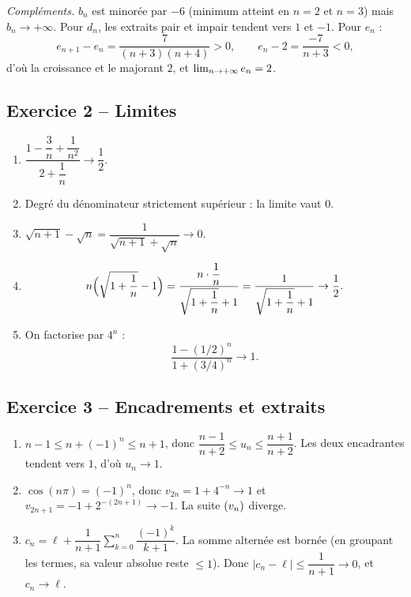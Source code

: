 \documentclass[11pt,a4paper]{article}
\begin{document}
\textit{Compléments.} $b_n$ est minorée par $-6$ (minimum atteint en $n=2$ et $n=3$) mais $b_n\to+\infty$. Pour $d_n$, les extraits pair et impair tendent vers $1$ et $-1$. Pour $e_n$ :
\[
e_{n+1}-e_n = \dfrac{7}{(n+3)(n+4)}>0, \qquad e_n-2=\dfrac{-7}{n+3}<0,
\]
d'où la croissance et le majorant $2$, et $\lim_{n\to +\infty} e_n=2$.

\subsection{Exercice 2 -- Limites}

\begin{enumerate}
  \item $\dfrac{1-\dfrac{3}{n}+\dfrac{1}{n^2}}{2+\dfrac{1}{n}}\to \dfrac{1}{2}$.
  \item Degré du dénominateur strictement supérieur : la limite vaut $0$.
  \item $\sqrt{n+1}-\sqrt{n} = \dfrac{1}{\sqrt{n+1}+\sqrt{n}}\to 0$.
  \item
  \[
  n\Bigl(\sqrt{1+\dfrac{1}{n}}-1\Bigr)
  = \dfrac{n\cdot\dfrac{1}{n}}{\sqrt{1+\dfrac{1}{n}}+1}
  = \dfrac{1}{\sqrt{1+\dfrac{1}{n}}+1}\to \dfrac12.
  \]
  \item On factorise par $4^n$ :
  \[
  \dfrac{1-(1/2)^n}{1+(3/4)^n}\to 1.
  \]
\end{enumerate}

\subsection{Exercice 3 -- Encadrements et extraits}

\begin{enumerate}
  \item $n-1\leq n+(-1)^n\leq n+1$, donc $\dfrac{n-1}{n+2}\leq u_n\leq \dfrac{n+1}{n+2}$. Les deux encadrantes tendent vers $1$, d'où $u_n\to 1$.

  \item $\cos(n\pi)=(-1)^n$, donc $v_{2n}=1+4^{-n}\to 1$ et $v_{2n+1}=-1+2^{-(2n+1)}\to -1$. La suite $(v_n)$ diverge.

  \item $c_n = \ell + \dfrac{1}{n+1}\sum_{k=0}^n \dfrac{(-1)^k}{k+1}$. La somme alternée est bornée (en groupant les termes, sa valeur absolue reste $\leq 1$). Donc $\lvert c_n-\ell\rvert \leq \dfrac{1}{n+1}\to 0$, et $c_n\to\ell$.
\end{enumerate}
\end{document}
